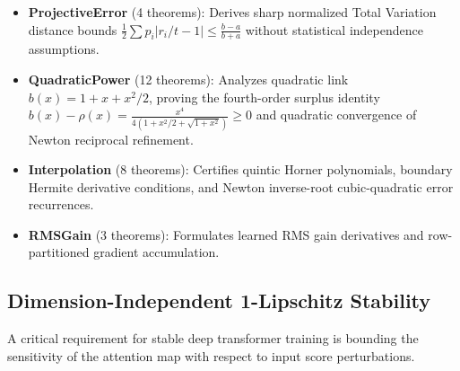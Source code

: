 \documentclass[11pt,a4paper]{article}
\theoremstyle{definition}
\begin{document}
\begin{itemize}
    \item \textbf{ProjectiveError} (4 theorems): Derives sharp normalized Total Variation distance bounds $\frac{1}{2}\sum p_i |r_i/t - 1| \le \frac{b-a}{b+a}$ without statistical independence assumptions.
    \item \textbf{QuadraticPower} (12 theorems): Analyzes quadratic link $b(x) = 1 + x + x^2/2$, proving the fourth-order surplus identity $b(x) - \rho(x) = \frac{x^4}{4(1 + x^2/2 + \sqrt{1+x^2})} \ge 0$ and quadratic convergence of Newton reciprocal refinement.
    \item \textbf{Interpolation} (8 theorems): Certifies quintic Horner polynomials, boundary Hermite derivative conditions, and Newton inverse-root cubic-quadratic error recurrences.
    \item \textbf{RMSGain} (3 theorems): Formulates learned RMS gain derivatives and row-partitioned gradient accumulation.
\end{itemize}

\subsection{Dimension-Independent 1-Lipschitz Stability}
\label{subsec:lipschitz}

A critical requirement for stable deep transformer training is bounding the sensitivity of the attention map with respect to input score perturbations.
\end{document}
